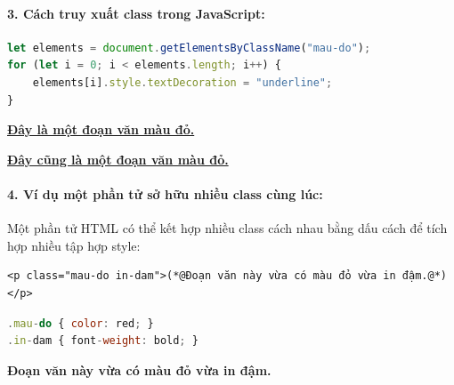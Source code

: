 \documentclass[11pt,oneside]{book}
\begin{document}
\paragraph{3. Cách truy xuất class trong JavaScript:}
\begin{codeWindow}
\begin{lstlisting}[language=JavaScript]
let elements = document.getElementsByClassName("mau-do");
for (let i = 0; i < elements.length; i++) {
    elements[i].style.textDecoration = "underline";
}
\end{lstlisting}
\end{codeWindow}

\begin{browserWindow}
\centering\sffamily
{\color{red}\bfseries\underline{Đây là một đoạn văn màu đỏ.}} \par\vspace{4pt}
{\color{red}\bfseries\underline{Đây cũng là một đoạn văn màu đỏ.}}
\end{browserWindow}


\paragraph{4. Ví dụ một phần tử sở hữu nhiều class cùng lúc:}
Một phần tử HTML có thể kết hợp nhiều class cách nhau bằng dấu cách để tích hợp nhiều tập hợp style:
\begin{codeWindow}
\begin{lstlisting}[language=HTML5]
<p class="mau-do in-dam">(*@Đoạn văn này vừa có màu đỏ vừa in đậm.@*)</p>
\end{lstlisting}
\end{codeWindow}

\begin{codeWindow}
\begin{lstlisting}[language=JavaScript]
.mau-do { color: red; }
.in-dam { font-weight: bold; }
\end{lstlisting}
\end{codeWindow}

\begin{browserWindow}
\centering\sffamily
{\color{red}\bfseries Đoạn văn này vừa có màu đỏ vừa in đậm.}
\end{browserWindow}
\end{document}
